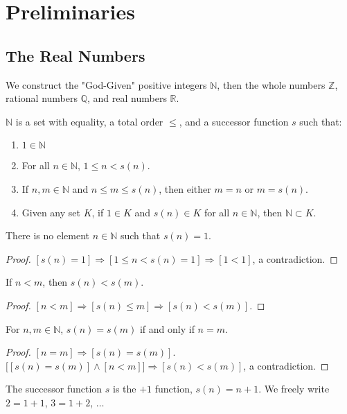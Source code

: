\documentclass[crop=false,class=article,oneside]{standalone}
\begin{document}
    \ifx\ifsub\undefined
        \section*{Preliminaries}
        \setcounter{section}{1}
    \fi
    \subsection{The Real Numbers}
    We construct the "God-Given" positive integers $\mathbb{N}$, then the whole numbers $\mathbb{Z}$, rational numbers $\mathbb{Q}$, and real numbers $\mathbb{R}$.
    \begin{definition}
    $\mathbb{N}$ is a set with equality, a total order $\leq$, and a successor function $s$ such that:
    \begin{enumerate}
    \item $1\in \mathbb{N}$
    \item For all $n\in \mathbb{N}$, $1\leq n < s(n)$.
    \item If $n,m\in \mathbb{N}$ and $n\leq m \leq s(n)$, then either $m=n$ or $m=s(n)$.
    \item Given any set $K$, if $1\in K$ and $s(n)\in K$ for all $n\in \mathbb{N}$, then $\mathbb{N}\subset K$.
    \end{enumerate}
    \end{definition}
    \begin{theorem}
    There is no element $n\in \mathbb{N}$ such that $s(n) =1$.
    \end{theorem}
    \begin{proof}
    $[s(n) = 1]\Rightarrow [1\leq n < s(n)=1]\Rightarrow[1<1]$, a contradiction.
    \end{proof}
    \begin{theorem}
    If $n<m$, then $s(n)< s(m)$.
    \end{theorem}
    \begin{proof}
    $[n<m]\Rightarrow [s(n)\leq m] \Rightarrow [s(n) < s(m)]$.
    \end{proof}
    \begin{theorem}
    For $n,m\in \mathbb{N}$, $s(n)=s(m)$ if and only if $n=m$.
    \end{theorem}
    \begin{proof}
    $[n=m]\Rightarrow [s(n)=s(m)]$. $\big[[s(n)=s(m)]\land [n<m]\big] \Rightarrow [s(n)<s(m)]$, a contradiction.
    \end{proof}
    \begin{remark}
    The successor function $s$ is the $+1$ function, $s(n)=n+1$. We freely write $2=1+1$, $3=1+2$, $\hdots$
    \end{remark}
\end{document}
